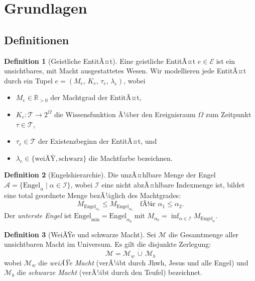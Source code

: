 ﻿\documentclass[a4paper,12pt]{article}
\theoremstyle{definition}
\newtheorem{definition}{Definition}
\begin{document}
\section{Grundlagen}

\subsection{Definitionen}

\begin{definition}[Geistliche EntitÃ¤t]
  Eine geistliche EntitÃ¤t $e \in \mathcal{E}$ ist ein unsichtbares, mit Macht
  ausgestattetes Wesen. Wir modellieren jede EntitÃ¤t durch ein Tupel
  $e = (M_e,\, K_e,\, \tau_e,\, \lambda_e)$, wobei
  \begin{itemize}
    \item $M_e \in \mathbb{R}_{> 0}$ der Machtgrad der EntitÃ¤t,
    \item $K_e: \mathcal{T} \to 2^{\Omega}$ die Wissensfunktion Ã¼ber den Ereignisraum
          $\Omega$ zum Zeitpunkt $\tau \in \mathcal{T}$,
    \item $\tau_e \in \mathcal{T}$ der Existenzbeginn der EntitÃ¤t, und
    \item $\lambda_e \in \{\text{weiÃŸ}, \text{schwarz}\}$ die Machtfarbe bezeichnen.
  \end{itemize}
\end{definition}

\begin{definition}[Engelshierarchie]
  Die unzÃ¤hlbare Menge der Engel $\mathcal{A} = \{\mathrm{Engel}_\alpha \mid
  \alpha \in \mathcal{I}\}$, wobei $\mathcal{I}$ eine nicht abzÃ¤hlbare Indexmenge ist,
  bildet eine total geordnete Menge bezÃ¼glich des Machtgrades:
  \[
    M_{\mathrm{Engel}_{\alpha_1}} \leq M_{\mathrm{Engel}_{\alpha_2}}
    \quad \text{fÃ¼r } \alpha_1 \leq \alpha_2.
  \]
  Der \emph{unterste Engel} ist $\mathrm{Engel}_{\min} = \mathrm{Engel}_{\alpha_0}$
  mit $M_{\alpha_0} = \inf_{\alpha \in \mathcal{I}} M_{\mathrm{Engel}_\alpha}$.
\end{definition}

\begin{definition}[WeiÃŸe und schwarze Macht]
  Sei $\mathcal{M}$ die Gesamtmenge aller unsichtbaren Macht im Universum. Es gilt
  die disjunkte Zerlegung:
  \[
    \mathcal{M} = \mathcal{M}_w \,\dot{\cup}\, \mathcal{M}_b
  \]
  wobei $\mathcal{M}_w$ die \emph{weiÃŸe Macht} (verÃ¼bt durch Jhwh, Jesus und alle
  Engel) und $\mathcal{M}_b$ die \emph{schwarze Macht} (verÃ¼bt durch den Teufel)
  bezeichnet.
\end{definition}
\end{document}
